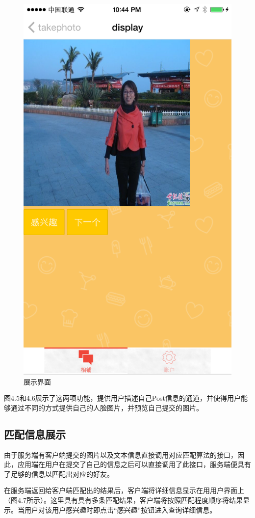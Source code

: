 \begin{figure}[h]
\begin{minipage}[t]{0.3\linewidth}
\includegraphics[width=\textwidth]{img/chap4/display.PNG}
\caption{展示界面\label{instagram}}
\end{minipage}



\end{figure}
图4.5和4.6展示了这两项功能，提供用户描述自己Post信息的通道，并使得用户能够通过不同的方式提供自己的人脸图片，并预览自己提交的图片。
\subsection{匹配信息展⽰}
由于服务端有客户端提交的图片以及文本信息直接调用对应匹配算法的接口，因此，应用端在用户在提交了自己的信息之后可以直接调用了此接口，服务端便具有了足够的信息以匹配出对应的好友。

在服务端返回给客户端匹配出的结果后，客户端将详细信息显⽰在⽤用户界⾯上（图4.7所示）。这里具有具有多条匹配结果，客户端将按照匹配程度顺序将结果显⽰。当用户对该用户感兴趣时即点击“感兴趣”按钮进入查询详细信息。




